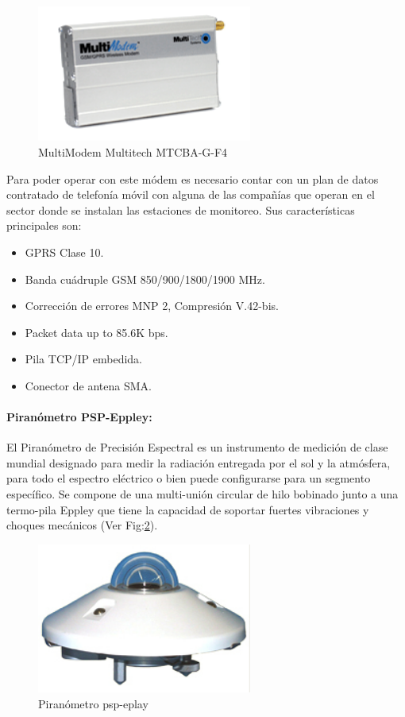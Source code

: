 \begin{figure}[h!]
        \centering
        \includegraphics[width=200pt]{images/MultiModemGPRS}
        \caption{MultiModem Multitech MTCBA-G-F4}
	\label{modem} 
\end{figure}

Para poder operar con este módem es necesario contar con un plan de datos contratado de telefonía móvil con alguna de las compañías que operan en el sector donde se instalan las estaciones de monitoreo. Sus características principales son:\\

\begin{itemize}
\item GPRS Clase 10.
\item Banda cuádruple GSM 850/900/1800/1900 MHz.
\item Corrección de errores MNP 2, Compresión V.42-bis.
\item Packet data up to 85.6K bps.
\item Pila TCP/IP embedida.
\item Conector de antena SMA.
\end{itemize}

\paragraph{Piranómetro PSP-Eppley:}
El Piranómetro de Precisión Espectral es un instrumento de medición de clase mundial designado para medir la radiación entregada por el sol y la atmósfera, para todo el espectro eléctrico o bien puede configurarse para un segmento específico. Se compone de una multi-unión circular de hilo bobinado junto a una termo-pila Eppley que tiene la capacidad de soportar fuertes vibraciones y choques mecánicos (Ver Fig:\ref{piranometro}).

\begin{figure}[h!]
        \centering
        \includegraphics[width=200pt]{images/piranometro}
        \caption{Piranómetro psp-eplay}
	\label{piranometro}
\end{figure}


